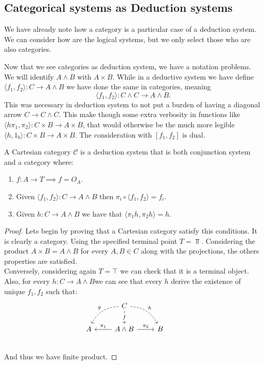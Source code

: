 \subsection{Categorical systems as Deduction systems}

We have already note how a category is a particular case of a deduction system. We can consider how are the logical systems, but we only select those who are also categories.

\begin{remark}Now that  we see categories as deduction system, we have a notation problems. We will identify $A\land B$ with $A\times B$. While in a deductive system we have define $\langle f_1,f_2\rangle : C \to A\land B$ we have done the same in categories, meaning $$\langle f_1,f_2\rangle : C \land C \to A \land B.$$  This was necessary in deduction system to not put a burden of having a diagonal arrow $C\to C\land C$. This make though some extra verbosity in functions like $\langle h\pi_1, \pi_2\rangle : C\times B \to A\times B$, that would otherwise be the much more legible $\langle h, 1_b\rangle: C\times B \to A \times B$.  The consideration with $[f_1,f_2]$ is dual.
  
\end{remark}


\begin{proposition}\label{prop:CartCategory2}
  A Cartesian category $\mathcal{C}$ is a deduction system that is both conjunction system and a category where:
  \begin{enumerate}
  \item $f:A\to T\implies f=O_A$.
  \item Given $\langle f_1,f_2\rangle: C\to A\land B$ then $\pi_i \circ \langle f_1,f_2\rangle = f_i$.
  \item Given $h:C\to A\land B$ we have that $\langle \pi_1 h, \pi_2 h\rangle = h$.
  \end{enumerate}
\end{proposition}

\begin{proof}

  Lets begin by proving that a Cartesian category satisfy this conditions. It is clearly a category. Using the specified terminal point $T=\Top$.  Considering the product $A\times B = A\land B$ for every $A,B \in C$ along with the projections, the others properties are satisfied.\\

  Conversely, considering again $T= \top$ we can check that it is a terminal object. Also, for every $h:C\to A\land B$we can see that every $h$ derive the existence of unique $f_1,f_2$ such that:
  \[
    \begin{tikzcd}
      {} & C \arrow[bend right,swap,dashed]{dl}{g}
      \arrow[bend left,dashed]{dr}{h} \arrow{d}[description]{f}& & \\
      A  &A\land B \arrow{l}[swap]{\pi_1} \arrow{r}{\pi_2} & 
      B \\
    \end{tikzcd}
  \]
  And thus we have finite product.
\end{proof}

